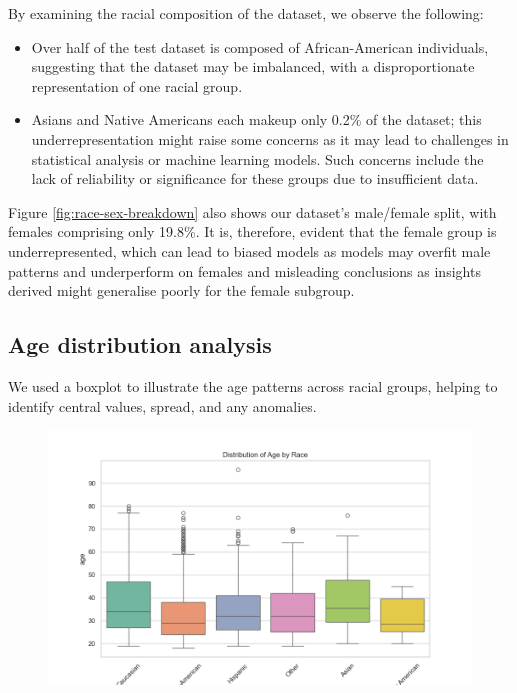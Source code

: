 

By examining the racial composition of the dataset, we observe the following:

\begin{itemize}
	\item Over half of the test dataset is composed of African-American individuals, suggesting that the dataset may be imbalanced, with a disproportionate representation of one racial group.
	\item Asians and Native Americans each makeup only 0.2\% of the dataset; this underrepresentation might raise some concerns as it may lead to challenges in statistical analysis or machine learning models. Such concerns include the lack of reliability or significance for these groups due to insufficient data.
\end{itemize}

Figure \ref{fig:race-sex-breakdown} also shows our dataset's male/female split, with females comprising only 19.8\%. It is, therefore, evident that the female group is underrepresented, which can lead to biased models as models may overfit male patterns and underperform on females and misleading conclusions as insights derived might generalise poorly for the female subgroup.


\subsection{Age distribution analysis}


We used a boxplot to illustrate the age patterns across racial groups, helping to identify central values, spread, and any anomalies.

\begin{figure}[H]
	\centering
	\includegraphics[width=0.9	\linewidth]{img/age_by_race_boxplot}
	\caption{}
	\label{fig:age-by-race-boxplot}
\end{figure}



